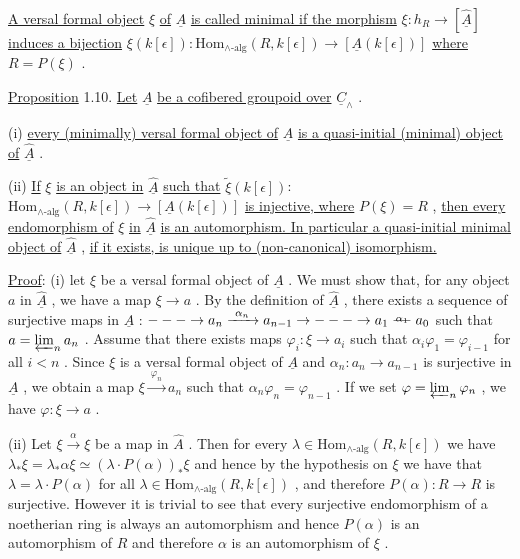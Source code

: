 \underline{A versal formal object} $\xi$ \underline{of} $\underline{A}$ \underline{is called minimal if the morphism} $\xi : h_R \to [\hat{\underline{A}}]$ \underline{induces a bijection} $\xi(k[\epsilon]) : \mathrm{Hom}_{\wedge\text{-alg}}(R,k[\epsilon]) \to [\underline{A}(k[\epsilon])]$ \underline{where} $R = P(\xi)$ .

\underline{Proposition} 1.10.  \underline{Let} $\underline{A}$ \underline{be a cofibered groupoid over} $\underline{C}_{\wedge}$ .

  (i)  \underline{every (minimally) versal formal object of} $\underline{A}$ \underline{is a quasi-initial (minimal) object of} $\hat{\underline{A}}$ .

  (ii) \underline{If} $\xi$ \underline{is an object in} $\hat{\underline{A}}$ \underline{such that} $\widetilde{\xi}(k[\epsilon])$: $\mathrm{Hom}_{\wedge\text{-alg}}(R,k[\epsilon])\to [\underline{A}(k[\epsilon])]$ \underline{is injective, where} $P(\xi) = R$ , \underline{then every endomorphism of} $\xi$ \underline{in} $\hat{\underline{A}}$ \underline{is an automorphism. In particular a quasi-initial minimal object of} $\hat{\underline{A}}$ , \underline{if it exists, is unique up to (non-canonical) isomorphism.}

\underline{Proof}: (i) let $\xi$ be a versal formal object of $\underline{A}$ . We must show that, for any object $a$ in $\hat{\underline{A}}$ , we have a map $\xi \to a$ . By the definition of $\hat{\underline{A}}$ , there exists a sequence of surjective maps in $\underline{A}$ : $--- \to a_n \xrightarrow{\ \alpha_n\ } a_{n-1} \to --- \to a_1 \overset{\alpha_1}{\relbar\joinrel\relbar} a_0$ such that $a = \varprojlim_n a_n$ . Assume that there exists maps $\varphi_i : \xi \to a_i$ such that $\alpha_i\varphi_1 = \varphi_{i-1}$ for all $i < n$ . Since $\xi$ is a versal formal object of $\underline{A}$ and $\alpha_n : a_n \to a_{n-1}$ is surjective in $\underline{A}$ , we obtain a map $\xi \xrightarrow{\ \varphi_n\ } a_n$ such that $\alpha_n\varphi_n = \varphi_{n-1}$ . If we set $\varphi = \varprojlim_n \varphi_n$ , we have $\varphi : \xi \to a$ .

(ii) Let $\xi \xrightarrow{\ \alpha\ } \xi$ be a map in $\hat{A}$ . Then for every $\lambda \in \mathrm{Hom}_{\wedge\text{-alg}}(R,k[\epsilon])$ we have $\lambda_*\xi = \lambda_*\alpha\xi \simeq (\lambda\cdot P(\alpha))_*\xi$ and hence by the hypothesis on $\xi$ we have that $\lambda = \lambda\cdot P(\alpha)$ for all $\lambda \in \mathrm{Hom}_{\wedge\text{-alg}}(R,k[\epsilon])$ , and therefore $P(\alpha) : R \to R$ is surjective. However it is trivial to see that every surjective endomorphism of a noetherian ring is always an automorphism and hence $P(\alpha)$ is an automorphism of $R$ and therefore $\alpha$ is an automorphism of $\xi$ .


